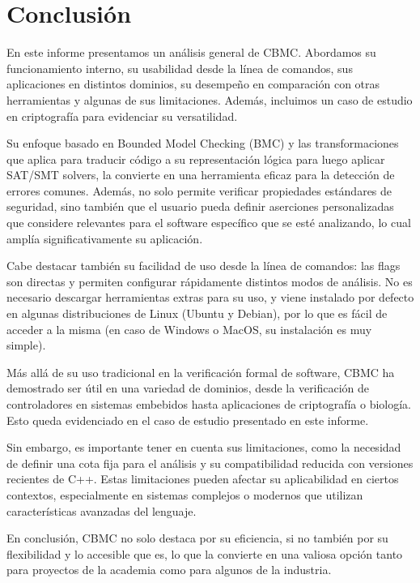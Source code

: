 \documentclass[runningheads]{llncs}
\begin{document}
%
\section{Conclusión}
En este informe presentamos un análisis general de CBMC.
Abordamos su funcionamiento interno, su usabilidad desde la línea de comandos, sus aplicaciones en distintos dominios, su desempeño en comparación con otras herramientas y algunas de sus limitaciones.
Además, incluimos un caso de estudio en criptografía para evidenciar su versatilidad.

Su enfoque basado en Bounded Model Checking (BMC) y las transformaciones que aplica para traducir código a su representación lógica para luego aplicar SAT/SMT solvers, la convierte
en una herramienta eficaz para la detección de errores comunes.
Además, no solo permite verificar propiedades estándares de seguridad, sino también que el usuario pueda definir aserciones personalizadas que considere
relevantes para el software específico que se esté analizando, lo cual amplía significativamente su aplicación.

Cabe destacar también su facilidad de uso desde la línea de comandos: las flags son directas y permiten configurar rápidamente distintos modos de análisis.
No es necesario descargar herramientas extras para su uso, y viene instalado por defecto en algunas distribuciones de Linux (Ubuntu y Debian), por lo que es
fácil de acceder a la misma (en caso de Windows o MacOS, su instalación es muy simple).

Más allá de su uso tradicional en la verificación formal de software, CBMC ha demostrado ser útil en una variedad de dominios, desde la verificación de controladores en
sistemas embebidos hasta aplicaciones de criptografía o biología.
Esto queda evidenciado en el caso de estudio presentado en este informe.

Sin embargo, es importante tener en cuenta sus limitaciones, como la necesidad de definir una cota fija para el análisis y su compatibilidad reducida con versiones recientes de C++.
Estas limitaciones pueden afectar su aplicabilidad en ciertos contextos, especialmente en sistemas complejos o modernos que utilizan características avanzadas del lenguaje.

En conclusión, CBMC no solo destaca por su eficiencia, si no también por su flexibilidad y lo accesible que es, lo que la convierte en una valiosa opción tanto para
proyectos de la academia como para algunos de la industria.



\end{document}
